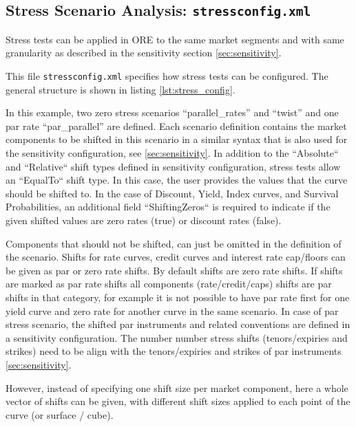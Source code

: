\subsection{Stress Scenario Analysis: {\tt stressconfig.xml}}\label{sec:stress}

Stress tests can be applied in ORE to the same market segments and with same granularity as described in the sensitivity section \ref{sec:sensitivity}.

\medskip
This file {\tt stressconfig.xml} specifies how stress tests can be configured. The general structure is shown in listing
\ref{lst:stress_config}.

In this example, two zero stress scenarios ``parallel\_rates'' and ``twist'' and one par rate ``par\_parallel'' are defined. 
Each scenario definition contains
the market components to be shifted in this scenario in a similar syntax that is also used for the sensitivity
configuration, see \ref{sec:sensitivity}. In addition to the ``Absolute`` and ``Relative`` shift types defined in sensitivity 
configuration, stress tests allow an ``EqualTo`` shift type. In this case, the user provides the values that the curve should
be shifted to. In the case of Discount, Yield, Index curves, and Survival Probabilities, an additional field ``ShiftingZeros``
is required to indicate if the given shifted values are zero rates (true) or discount rates (false).

Components that should not be shifted, can just be omitted in the definition
of the scenario. Shifts for rate curves, credit curves and interest rate cap/floors can be given as par or zero rate shifts.
By default shifts are zero rate shifts. If shifts are marked as par rate shifts all components (rate/credit/caps) shifts are 
par shifts in that category, for example it is not possible to have par rate first for one yield curve and zero rate for 
another curve in the same scenario. In case of par stress scenario, the shifted par instruments and related conventions are defined 
in a sensitivity configuration.  The number number stress shifts (tenors/expiries and strikes) need to be align with
 the tenors/expiries and strikes of par instruments \ref{sec:sensitivity}.

However, instead of specifying one shift size per market component, here a whole vector of shifts can be given, with
different shift sizes applied to each point of the curve (or surface / cube).

